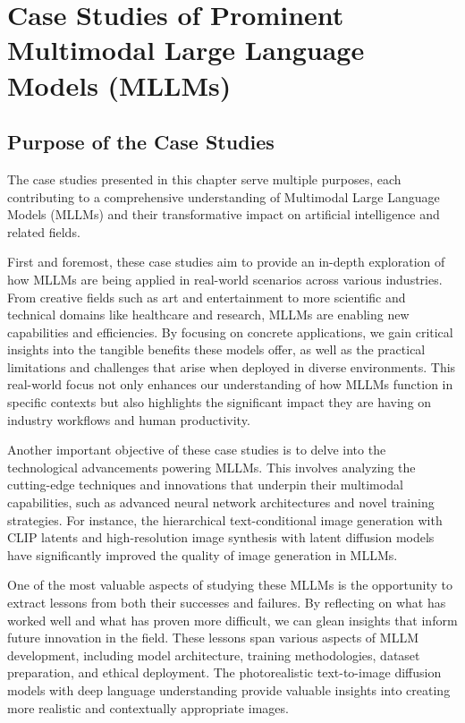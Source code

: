 \chapter{Case Studies of Prominent Multimodal Large Language Models (MLLMs)}



\section{Purpose of the Case Studies}
The case studies presented in this chapter serve multiple purposes, each contributing to a comprehensive understanding of Multimodal Large Language Models (MLLMs) and their transformative impact on artificial intelligence and related fields.

First and foremost, these case studies aim to provide an in-depth exploration of how MLLMs are being applied in real-world scenarios across various industries. From creative fields such as art and entertainment to more scientific and technical domains like healthcare and research, MLLMs are enabling new capabilities and efficiencies. By focusing on concrete applications, we gain critical insights into the tangible benefits these models offer, as well as the practical limitations and challenges that arise when deployed in diverse environments. This real-world focus not only enhances our understanding of how MLLMs function in specific contexts but also highlights the significant impact they are having on industry workflows and human productivity.

Another important objective of these case studies is to delve into the technological advancements powering MLLMs. This involves analyzing the cutting-edge techniques and innovations that underpin their multimodal capabilities, such as advanced neural network architectures and novel training strategies. For instance, the hierarchical text-conditional image generation with CLIP latents \cite{ramesh2022hierarchical} and high-resolution image synthesis with latent diffusion models \cite{rombach2022high} have significantly improved the quality of image generation in MLLMs.

One of the most valuable aspects of studying these MLLMs is the opportunity to extract lessons from both their successes and failures. By reflecting on what has worked well and what has proven more difficult, we can glean insights that inform future innovation in the field. These lessons span various aspects of MLLM development, including model architecture, training methodologies, dataset preparation, and ethical deployment. The photorealistic text-to-image diffusion models with deep language understanding \cite{saharia2022photorealistic} provide valuable insights into creating more realistic and contextually appropriate images.

